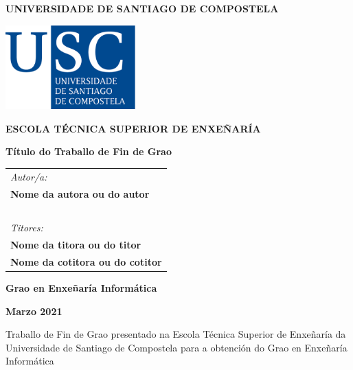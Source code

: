 \pagestyle{empty}
\begin{center}
	{\bf\Large UNIVERSIDADE DE SANTIAGO DE COMPOSTELA}
	
	\vspace{0.5cm}
	\includegraphics[width=5cm]{figuras/logo_usc.eps}
	
	\vspace{0.5cm}
	{\bf\large ESCOLA TÉCNICA SUPERIOR DE ENXEÑARÍA}
	
	\vspace{3cm}
	{\bf\LARGE Título do Traballo de Fin de Grao}
	
\end{center}

\vspace{2cm}
\hspace{4cm}\begin{tabular}{l}
	{\it\Large Autor/a:} \\
	{\bf\Large Nome da autora ou do autor} \\
	~ \\
	{\it\Large Titores:} \\
	{\bf\Large Nome da titora ou do titor} \\
	{\bf\Large Nome da cotitora ou do cotitor} \\
\end{tabular}

\vspace{2cm}
\begin{center}
	{\bf\Large Grao en Enxeñaría Informática}
	
	\vspace{0.5cm}
	{\bf\large Marzo 2021}
	
	\vspace{0.5cm}
	Traballo de Fin de Grao presentado na Escola Técnica Superior de Enxeñaría da Universidade de Santiago de Compostela para a obtención do Grao en Enxeñaría Informática
\end{center}

